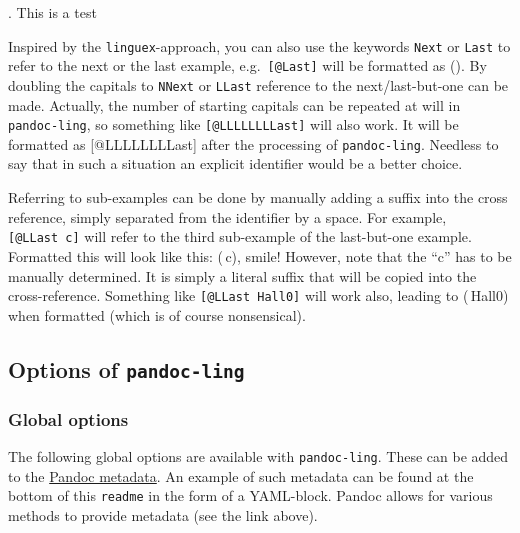 \documentclass[
]{article}
\begin{document}
\ex. \label{test} 
  This is a test

Inspired by the \texttt{linguex}-approach, you can also use the keywords
\texttt{Next} or \texttt{Last} to refer to the next or the last example,
e.g.~\texttt{{[}@Last{]}} will be formatted as ({\Last}). By doubling
the capitals to \texttt{NNext} or \texttt{LLast} reference to the
next/last-but-one can be made. Actually, the number of starting capitals
can be repeated at will in \texttt{pandoc-ling}, so something like
\texttt{{[}@LLLLLLLLast{]}} will also work. It will be formatted as
{[}@LLLLLLLLast{]} after the processing of \texttt{pandoc-ling}.
Needless to say that in such a situation an explicit identifier would be
a better choice.

Referring to sub-examples can be done by manually adding a suffix into
the cross reference, simply separated from the identifier by a space.
For example, \texttt{{[}@LLast~c{]}} will refer to the third sub-example
of the last-but-one example. Formatted this will look like this:
({\LLast}\,c), smile! However, note that the ``c'' has to be manually
determined. It is simply a literal suffix that will be copied into the
cross-reference. Something like \texttt{{[}@LLast\ Hall0{]}} will work
also, leading to ({\LLast}\,Hall0) when formatted (which is of course
nonsensical).

\hypertarget{options-of-pandoc-ling}{%
\subsection{\texorpdfstring{Options of
\texttt{pandoc-ling}}{Options of pandoc-ling}}\label{options-of-pandoc-ling}}

\hypertarget{global-options}{%
\subsubsection{Global options}\label{global-options}}

The following global options are available with \texttt{pandoc-ling}.
These can be added to the
\href{https://pandoc.org/MANUAL.html\#metadata-blocks}{Pandoc metadata}.
An example of such metadata can be found at the bottom of this
\texttt{readme} in the form of a YAML-block. Pandoc allows for various
methods to provide metadata (see the link above).
\end{document}
